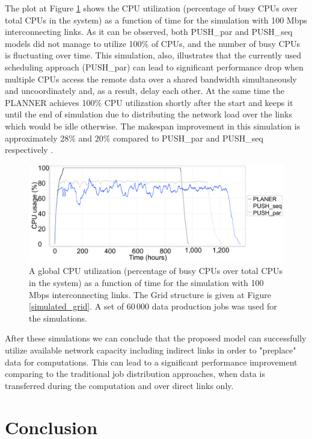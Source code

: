 \documentclass{svjour3}                     %
\begin{document}
The plot at Figure \ref{multi_cpu_consumption} shows the CPU utilization (percentage of busy CPUs over total CPUs in the system) as a function of time for the simulation with 100 Mbps interconnecting links. As it can be observed, both PUSH\_par and PUSH\_seq models did not manage to utilize 100\% of CPUs, and the number of busy CPUs is fluctuating over time. This simulation, also, illustrates that the currently used scheduling approach (PUSH\_par) can lead to significant performance drop when multiple CPUs access the remote data over a shared bandwidth simultaneously and uncoordinately and, as a result, delay each other. At the same time the PLANNER achieves 100\% CPU utilization shortly after the start and keeps it until the end of simulation due to distributing the network load over the links which would be idle otherwise. The makespan improvement in this simulation is approximately 28\% and 20\% compared to PUSH\_par and PUSH\_seq respectively .
\begin{figure}
  \begin{center}
    \includegraphics [trim= 0mm 00mm 0mm 00mm , clip,width=1\textwidth]{pic/3models_link01.png}
    \caption{A global CPU utilization (percentage of busy CPUs over total CPUs in the system) as a function of time for the simulation with 100 Mbps interconnecting links. The Grid structure is given at Figure \ref{simulated_grid}. A set of 60\,000 data production jobs was used for the simulations.}
      \label{multi_cpu_consumption}	
  \end{center}  
\end{figure}

After these simulations we can conclude that the proposed model can successfully utilize available network capacity including indirect links in order to "preplace" data for computations. This can lead to a significant performance improvement comparing to the traditional job distribution approaches, when data is transferred during the computation and over direct links only. 

\section{Conclusion}
\label{Conclusion}
\end{document}

